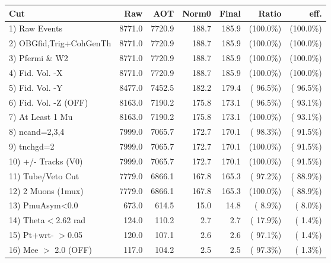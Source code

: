  \begin{table}[h!]\centering
 \begin{tabular}{||l||r|r|r|r|r|r||}
 \hline
 \hline
 Cut & Raw & AOT & Norm0 & Final & Ratio & eff.       \\
 \hline
  1) Raw Events           &       8771.0 &       7720.9 &        188.7 &        185.9 & (100.0\%) & (100.0\%) \\
  2) OBGfid,Trig+CohGenTh &       8771.0 &       7720.9 &        188.7 &        185.9 & (100.0\%) & (100.0\%) \\
  3) Pfermi \& W2         &       8771.0 &       7720.9 &        188.7 &        185.9 & (100.0\%) & (100.0\%) \\
  4) Fid. Vol. -X         &       8771.0 &       7720.9 &        188.7 &        185.9 & (100.0\%) & (100.0\%) \\
  5) Fid. Vol. -Y         &       8477.0 &       7452.5 &        182.2 &        179.4 & ( 96.5\%) & ( 96.5\%) \\
  6) Fid. Vol. -Z (OFF)   &       8163.0 &       7190.2 &        175.8 &        173.1 & ( 96.5\%) & ( 93.1\%) \\
  7) At Least 1 Mu        &       8163.0 &       7190.2 &        175.8 &        173.1 & (100.0\%) & ( 93.1\%) \\
  8) ncand=2,3,4          &       7999.0 &       7065.7 &        172.7 &        170.1 & ( 98.3\%) & ( 91.5\%) \\
  9) tnchgd=2             &       7999.0 &       7065.7 &        172.7 &        170.1 & (100.0\%) & ( 91.5\%) \\
 10) +/- Tracks (V0)      &       7999.0 &       7065.7 &        172.7 &        170.1 & (100.0\%) & ( 91.5\%) \\
 11) Tube/Veto Cut        &       7779.0 &       6866.1 &        167.8 &        165.3 & ( 97.2\%) & ( 88.9\%) \\
 12) 2 Muons (1mux)       &       7779.0 &       6866.1 &        167.8 &        165.3 & (100.0\%) & ( 88.9\%) \\
 13) PmuAsym<0.0          &        673.0 &        614.5 &         15.0 &         14.8 & (  8.9\%) & (  8.0\%) \\
 14) Theta$<$2.62 rad     &        124.0 &        110.2 &          2.7 &          2.7 & ( 17.9\%) & (  1.4\%) \\
 15) Pt+wrt- $>$0.05      &        120.0 &        107.1 &          2.6 &          2.6 & ( 97.1\%) & (  1.4\%) \\
 16) Mee $>$ 2.0  (OFF)   &        117.0 &        104.2 &          2.5 &          2.5 & ( 97.3\%) & (  1.3\%) \\

\end{tabular}
\end{table}
